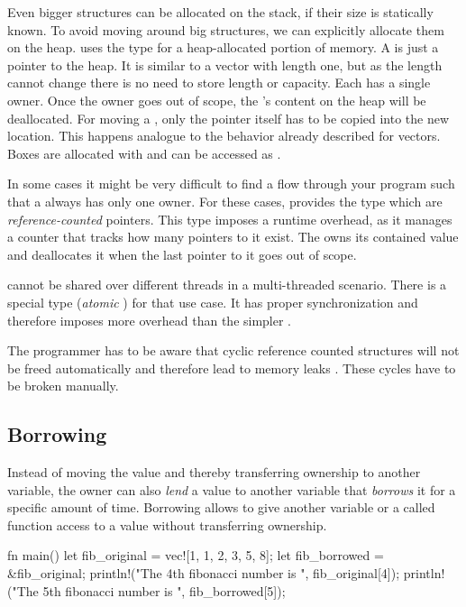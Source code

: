 Even bigger structures can be allocated on the stack, if their size is statically known.
To avoid moving around big structures, we can explicitly allocate them on the heap.
\rust uses the type  for a heap-allocated portion of memory.
A  is just a pointer to the heap.
It is similar to a vector with length one, but as the length cannot change there is no need to store length or capacity.
Each  has a single owner.
Once the owner goes out of scope, the 's content on the heap will be deallocated.
For moving a , only the pointer itself has to be copied into the new location.
This happens analogue to the behavior already described for vectors.
Boxes are allocated with  and can be accessed as .

In some cases it might be very difficult to find a flow through your program such that a  always has only one owner.
For these cases, \rust provides the type  which are \emph{reference-counted} pointers.
This type imposes a runtime overhead, as it manages a counter that tracks how many pointers to it exist.
The  owns its contained value and deallocates it when the last pointer to it goes out of scope.

 cannot be shared over different threads in a multi-threaded scenario.
There is a special type  (\emph{atomic }) for that use case.
It has proper synchronization and therefore imposes more overhead than the simpler .

The programmer has to be aware that cyclic reference counted structures will not be freed automatically and therefore lead to memory leaks \cite{RustCycles}.
These cycles have to be broken manually.


\subsection{Borrowing}

Instead of moving the value and thereby transferring ownership to another variable, the owner can also  \emph{lend} a value to another variable that \emph{borrows} it for a specific amount of time.
Borrowing allows to give another variable or a called function access to a value without transferring ownership.

\begin{rustcode}
fn main() {
	let fib_original = vec![1, 1, 2, 3, 5, 8];
	let fib_borrowed = &fib_original;
	println!("The 4th fibonacci number is {}", fib_original[4]);
	println!("The 5th fibonacci number is {}", fib_borrowed[5]);
}
\end{rustcode}

